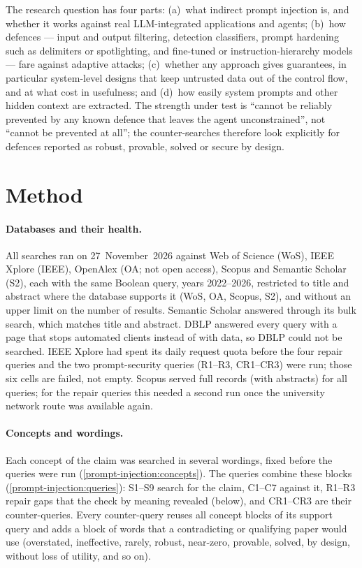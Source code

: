 The research question has four parts:
(a)~what indirect prompt injection is, and whether it works against real
LLM-integrated applications and agents;
(b)~how defences --- input and output filtering, detection classifiers,
prompt hardening such as delimiters or spotlighting, and fine-tuned or
instruction-hierarchy models --- fare against adaptive attacks;
(c)~whether any approach gives guarantees, in particular system-level
designs that keep untrusted data out of the control flow, and at what
cost in usefulness; and
(d)~how easily system prompts and other hidden context are extracted.
The strength under test is \enquote{cannot be reliably prevented by any
known defence that leaves the agent unconstrained}, not \enquote{cannot
be prevented at all}; the counter-searches therefore look explicitly for
defences reported as robust, provable, solved or secure by design.

\section{Method}
\label{prompt-injection:method}

\paragraph{Databases and their health.}
All searches ran on 27~November~2026 against Web of Science (WoS),
IEEE Xplore (IEEE), OpenAlex (OA; not open access), Scopus and Semantic
Scholar (S2), each with the same Boolean query, years 2022--2026,
restricted to title and abstract where the database supports it (WoS,
OA, Scopus, S2), and without an upper limit on the number of results.
Semantic Scholar answered through its bulk search, which matches title
and abstract. DBLP answered every query with a page that stops automated
clients instead of with data, so DBLP could not be searched. IEEE Xplore
had spent its daily request quota before the four repair queries and the
two prompt-security queries (R1--R3, CR1--CR3) were run; those six cells
are failed, not empty. Scopus served full records (with abstracts) for
all queries; for the repair queries this needed a second run once the
university network route was available again.

\paragraph{Concepts and wordings.}
Each concept of the claim was searched in several wordings, fixed before
the queries were run (\cref{prompt-injection:concepts}). The queries
combine these blocks (\cref{prompt-injection:queries}): S1--S9 search for
the claim, C1--C7 against it, R1--R3 repair gaps that the check by
meaning revealed (below), and CR1--CR3 are their counter-queries. Every
counter-query reuses all concept blocks of its support query and adds a
block of words that a contradicting or qualifying paper would use
(overstated, ineffective, rarely, robust, near-zero, provable, solved,
by design, without loss of utility, and so on).

